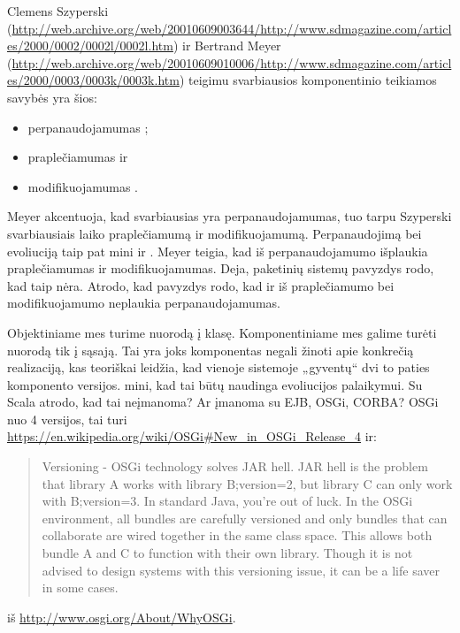 Clemens Szyperski
(\url{http://web.archive.org/web/20010609003644/http://www.sdmagazine.com/articles/2000/0002/0002l/0002l.htm})
ir Bertrand Meyer
(\url{http://web.archive.org/web/20010609010006/http://www.sdmagazine.com/articles/2000/0003/0003k/0003k.htm})
teigimu svarbiausios komponentinio teikiamos savybės yra šios:
\begin{itemize}
  \item perpanaudojamumas ;
  \item praplečiamumas  ir
  \item modifikuojamumas .
\end{itemize}
Meyer akcentuoja, kad svarbiausias yra perpanaudojamumas, tuo tarpu
Szyperski svarbiausiais laiko praplečiamumą ir modifikuojamumą.
Perpanaudojimą bei evoliuciją taip pat mini ir
\cite[28]{Hopkins:2000:CP:352183.352198}. Meyer teigia, kad
iš perpanaudojamumo išplaukia praplečiamumas ir modifikuojamumas.
Deja, paketinių sistemų pavyzdys rodo, kad taip nėra. Atrodo,
kad  pavyzdys rodo, kad ir iš praplečiamumo
bei modifikuojamumo neplaukia perpanaudojamumas.

Objektiniame mes turime nuorodą į klasę. Komponentiniame mes galime
turėti nuorodą tik į sąsają. Tai yra joks komponentas negali
žinoti apie konkrečią realizaciją, kas teoriškai leidžia, kad
vienoje sistemoje „gyventų“ dvi to paties komponento versijos.
\cite[44]{heineman2001component} mini, kad tai būtų naudinga
evoliucijos palaikymui. Su Scala atrodo, kad tai neįmanoma? Ar
įmanoma su EJB, OSGi, CORBA? OSGi nuo 4 versijos,
tai turi \url{https://en.wikipedia.org/wiki/OSGi#New_in_OSGi_Release_4}
ir:
\begin{quote}
  Versioning - OSGi technology solves JAR hell. JAR hell is the problem
  that library A works with library B;version=2, but library C can only
  work with B;version=3. In standard Java, you're out of luck. In the
  OSGi environment, all bundles are carefully versioned and only bundles
  that can collaborate are wired together in the same class space. This
  allows both bundle A and C to function with their own library. Though
  it is not advised to design systems with this versioning issue, it can
  be a life saver in some cases.
\end{quote}
iš \url{http://www.osgi.org/About/WhyOSGi}.
